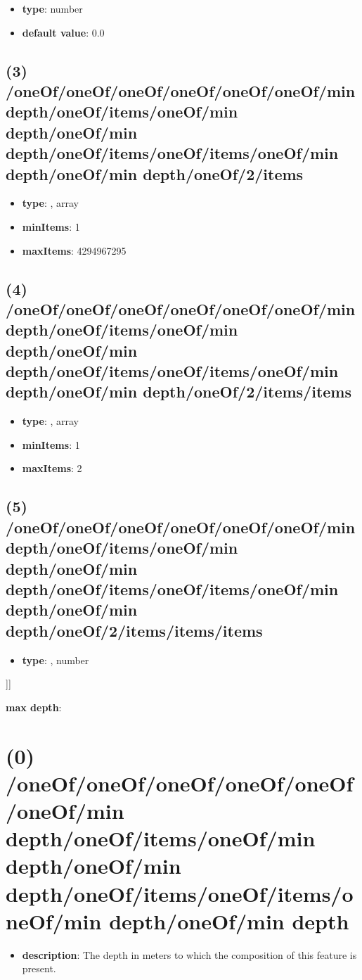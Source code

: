 \begin{itemize}[leftmargin=4em]\item {\bf type}: number\item {\bf default value}: 0.0
\end{itemize}\subsection{(3) /oneOf/oneOf/oneOf/oneOf/oneOf/oneOf/min depth/oneOf/items/oneOf/min depth/oneOf/min depth/oneOf/items/oneOf/items/oneOf/min depth/oneOf/min depth/oneOf/2/items}
\begin{itemize}[leftmargin=3em]\item {\bf type}: , array\item {\bf minItems}: 1
\item {\bf maxItems}: 4294967295
\end{itemize}\subsection{(4) /oneOf/oneOf/oneOf/oneOf/oneOf/oneOf/min depth/oneOf/items/oneOf/min depth/oneOf/min depth/oneOf/items/oneOf/items/oneOf/min depth/oneOf/min depth/oneOf/2/items/items}
\begin{itemize}[leftmargin=4em]\item {\bf type}: , array\item {\bf minItems}: 1
\item {\bf maxItems}: 2
\end{itemize}\subsection{(5) /oneOf/oneOf/oneOf/oneOf/oneOf/oneOf/min depth/oneOf/items/oneOf/min depth/oneOf/min depth/oneOf/items/oneOf/items/oneOf/min depth/oneOf/min depth/oneOf/2/items/items/items}
\begin{itemize}[leftmargin=5em]\item {\bf type}: , number\end{itemize}]]\item {\bf max depth}: \section{(0) /oneOf/oneOf/oneOf/oneOf/oneOf/oneOf/min depth/oneOf/items/oneOf/min depth/oneOf/min depth/oneOf/items/oneOf/items/oneOf/min depth/oneOf/min depth}
\begin{itemize}[leftmargin=0em]\item {\bf description}: The depth in meters to which the composition of this feature is present.
\end{itemize}
